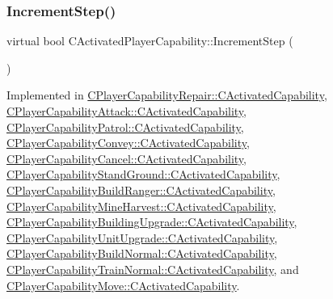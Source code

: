 \subsubsection{\texorpdfstring{Increment\+Step()}{IncrementStep()}}
{\footnotesize\ttfamily virtual bool C\+Activated\+Player\+Capability\+::\+Increment\+Step (\begin{DoxyParamCaption}{ }\end{DoxyParamCaption})\hspace{0.3cm}{\ttfamily [pure virtual]}}



Implemented in \hyperlink{classCPlayerCapabilityRepair_1_1CActivatedCapability_a5b5b42dbbda50b29e9f917df3cb0f650}{C\+Player\+Capability\+Repair\+::\+C\+Activated\+Capability}, \hyperlink{classCPlayerCapabilityAttack_1_1CActivatedCapability_a6b772cbd6be96fbd9bf88380b143856c}{C\+Player\+Capability\+Attack\+::\+C\+Activated\+Capability}, \hyperlink{classCPlayerCapabilityPatrol_1_1CActivatedCapability_a576a71646225c0723a0ed9e77add01fd}{C\+Player\+Capability\+Patrol\+::\+C\+Activated\+Capability}, \hyperlink{classCPlayerCapabilityConvey_1_1CActivatedCapability_ac1bf251eca552885041b1bcefa594591}{C\+Player\+Capability\+Convey\+::\+C\+Activated\+Capability}, \hyperlink{classCPlayerCapabilityCancel_1_1CActivatedCapability_a28351293b3a662bca20a2d666b8801e1}{C\+Player\+Capability\+Cancel\+::\+C\+Activated\+Capability}, \hyperlink{classCPlayerCapabilityStandGround_1_1CActivatedCapability_ab4061171835e4c1008176e5765ded595}{C\+Player\+Capability\+Stand\+Ground\+::\+C\+Activated\+Capability}, \hyperlink{classCPlayerCapabilityBuildRanger_1_1CActivatedCapability_a5fd10074c6b25ffb36401055ed90b70b}{C\+Player\+Capability\+Build\+Ranger\+::\+C\+Activated\+Capability}, \hyperlink{classCPlayerCapabilityMineHarvest_1_1CActivatedCapability_a46dbd6e2ae2fb889da1714c97ed3ca2f}{C\+Player\+Capability\+Mine\+Harvest\+::\+C\+Activated\+Capability}, \hyperlink{classCPlayerCapabilityBuildingUpgrade_1_1CActivatedCapability_acc732144e87e5fc88117c0b3a032a97a}{C\+Player\+Capability\+Building\+Upgrade\+::\+C\+Activated\+Capability}, \hyperlink{classCPlayerCapabilityUnitUpgrade_1_1CActivatedCapability_a86833312cb2f2460e923808fe0e19223}{C\+Player\+Capability\+Unit\+Upgrade\+::\+C\+Activated\+Capability}, \hyperlink{classCPlayerCapabilityBuildNormal_1_1CActivatedCapability_a19b9ba979e8deebcb2b7e4225af47d2e}{C\+Player\+Capability\+Build\+Normal\+::\+C\+Activated\+Capability}, \hyperlink{classCPlayerCapabilityTrainNormal_1_1CActivatedCapability_a201f09e738af96fba1a871e4ed00f18a}{C\+Player\+Capability\+Train\+Normal\+::\+C\+Activated\+Capability}, and \hyperlink{classCPlayerCapabilityMove_1_1CActivatedCapability_af4670890b462f59d24195db14aeb436d}{C\+Player\+Capability\+Move\+::\+C\+Activated\+Capability}.

